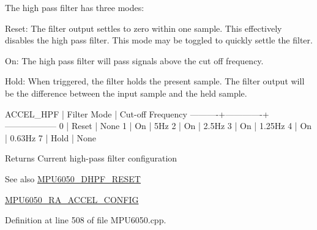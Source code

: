 The high pass filter has three modes\+:


\begin{DoxyPre}
   Reset: The filter output settles to zero within one sample. This
          effectively disables the high pass filter. This mode may be toggled
          to quickly settle the filter.\end{DoxyPre}



\begin{DoxyPre}   On:    The high pass filter will pass signals above the cut off frequency.\end{DoxyPre}



\begin{DoxyPre}   Hold:  When triggered, the filter holds the present sample. The filter
          output will be the difference between the input sample and the held
          sample.
\end{DoxyPre}



\begin{DoxyPre}
ACCEL\_HPF | Filter Mode | Cut-off Frequency
----------+-------------+------------------
0         | Reset       | None
1         | On          | 5Hz
2         | On          | 2.5Hz
3         | On          | 1.25Hz
4         | On          | 0.63Hz
7         | Hold        | None
\end{DoxyPre}


\begin{DoxyReturn}{Returns}
Current high-\/pass filter configuration 
\end{DoxyReturn}
\begin{DoxySeeAlso}{See also}
\mbox{\hyperlink{MPU6050_8h_aa27e7511d60ab2f0d99b4bb138539e25}{M\+P\+U6050\+\_\+\+D\+H\+P\+F\+\_\+\+R\+E\+S\+ET}} 

\mbox{\hyperlink{MPU6050_8h_a48b7d7b24a70b247e373bc5965a5dcc7}{M\+P\+U6050\+\_\+\+R\+A\+\_\+\+A\+C\+C\+E\+L\+\_\+\+C\+O\+N\+F\+IG}} 
\end{DoxySeeAlso}


Definition at line 508 of file M\+P\+U6050.\+cpp.


\begin{DoxyCode}{0}

\end{DoxyCode}
\mbox{\label{classMPU6050_a9f2737fe22955fd85b2575ba8da874c6}} 
